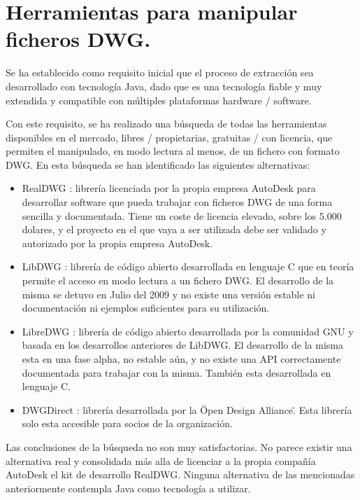 \section{Herramientas para manipular ficheros DWG.}

Se ha establecido como requisito inicial que el proceso de extracción sea desarrollado con tecnología Java, dado que es una tecnología fiable y muy extendida y compatible con múltiples plataformas hardware / software. 

Con este requisito, se ha realizado una búsqueda de todas las herramientas disponibles en el mercado, libres / propietarias, gratuitas / con licencia, que permiten el manipulado, en modo lectura al menos, de un fichero con formato DWG. En esta búsqueda se han identificado las siguientes alternativas:

\begin{itemize}

\item{RealDWG \cite{RealDWG}: librería licenciada por la propia empresa AutoDesk para desarrollar software que pueda trabajar con ficheros DWG de una forma sencilla y documentada. Tiene un coste de licencia elevado, sobre los 5.000 dolares, y el proyecto en el que vaya a ser utilizada debe ser validado y autorizado por la propia empresa AutoDesk.}

\item{LibDWG \cite{LibDWG}: librería de código abierto desarrollada en lenguaje C que en teoría permite el acceso en modo lectura a un fichero DWG. El desarrollo de la misma se detuvo en Julio del 2009 y no existe una versión estable ni documentación ni ejemplos suficientes para su utilización.}

\item{LibreDWG \cite{LibreDWG}: librería de código abierto desarrollada por la comunidad GNU y basada en los desarrollos anteriores de LibDWG. El desarrollo de la misma esta en una fase alpha, no estable aún, y no existe una API correctamente documentada para trabajar con la misma. También esta desarrollada en lenguaje C.}

\item{DWGDirect \cite{OpenDWG}: librería desarrollada por la \"Open Design Alliance\". Esta librería solo esta accesible para socios de la organización.}

\end{itemize}

Las conclusiones de la búsqueda no son muy satisfactorias. No parece existir una alternativa real y consolidada más alla de licenciar a la propia compañía AutoDesk el kit de desarrollo RealDWG. Ninguna alternativa de las mencionadas anteriormente contempla Java como tecnología a utilizar.

